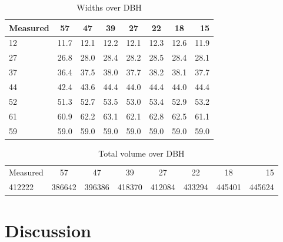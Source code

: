 \begin{table}[h!]
	\begin{center}
		\begin{tabular}{| l c c c c c c r |}
		\hline
		Measured & 57\degree & 47\degree & 39\degree & 27\degree & 22\degree & 18\degree & 15\degree \\
		\hline
		12       & 11.7      & 12.1      & 12.2      & 12.1      & 12.3      & 12.6      & 11.9      \\
		27       & 26.8      & 28.0      & 28.4      & 28.2      & 28.5      & 28.4      & 28.1      \\
		37       & 36.4      & 37.5      & 38.0      & 37.7      & 38.2      & 38.1      & 37.7      \\
		44       & 42.4      & 43.6      & 44.4      & 44.0      & 44.4      & 44.0      & 44.4      \\
		52       & 51.3      & 52.7      & 53.5      & 53.0      & 53.4      & 52.9      & 53.2      \\
		61       & 60.9      & 62.2      & 63.1      & 62.1      & 62.8      & 62.5      & 61.1      \\
		59       & 59.0      & 59.0      & 59.0      & 59.0      & 59.0      & 59.0      & 59.0      \\
		\hline
		\end{tabular}
		\caption{Widths over DBH}
		\label{widths}
    \end{center}
\end{table}

\begin{table}[h!]
	\begin{center}
    	\begin{tabular}{| l c c c c c c r |}
    	\hline
		Measured & 57\degree & 47\degree & 39\degree & 27\degree & 22\degree & 18\degree & 15\degree \\
		412222   & 386642    & 396386    & 418370    & 412084    & 433294    & 445401    & 445624    \\
		\hline
		\end{tabular}
		\caption{Total volume over DBH}
		\label{volumes}
    \end{center}
\end{table}

\section{Discussion}
